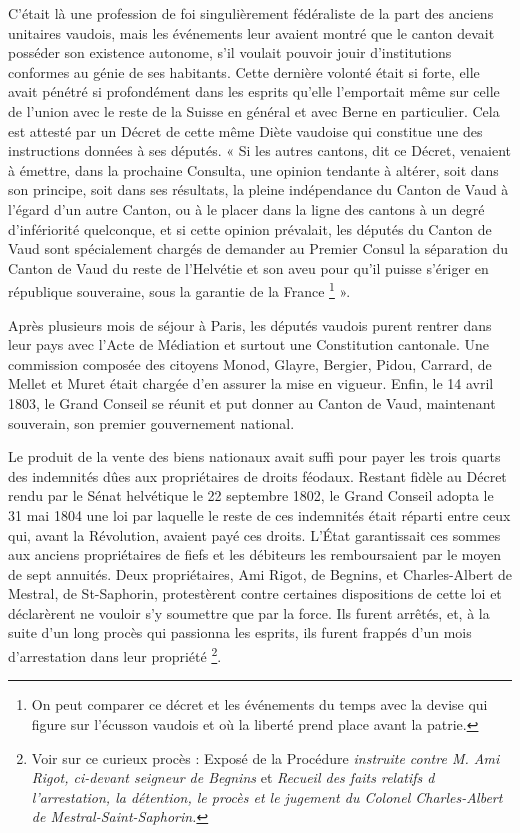 \documentclass[french,twoside]{book} %
\begin{document}
\noindent C’était là une profession de foi singulièrement fédéraliste de la part des anciens unitaires vaudois, mais les événements leur avaient montré que le canton devait posséder son existence autonome, s’il voulait pouvoir jouir d’institutions conformes au génie de ses habitants. Cette dernière volonté était si forte, elle avait pénétré si profondément dans les esprits qu’elle l’emportait même sur celle de l’union avec le reste de la Suisse en général et avec Berne en particulier. Cela est attesté par un Décret de cette même Diète vaudoise qui constitue une des instructions données à ses députés. « Si les autres cantons, dit ce Décret, venaient à émettre, dans la prochaine Consulta, une opinion tendante à altérer, soit dans son principe, soit dans ses résultats, la pleine indépendance du Canton de Vaud à l’égard d’un autre Canton, ou à le placer dans la ligne des cantons à un degré d’infériorité quelconque, et si cette opinion prévalait, les députés du Canton de Vaud sont spécialement chargés de demander au Premier Consul la séparation du Canton de Vaud du reste de l’Helvétie et son aveu pour qu’il puisse s’ériger en république souveraine, sous la garantie de la France \footnote{On peut comparer ce décret et les événements du temps avec la devise qui figure sur l’écusson vaudois et où la liberté prend place avant la patrie.} ».\par
Après plusieurs mois de séjour à Paris, les députés vaudois purent rentrer dans leur pays avec l’Acte de Médiation et surtout une Constitution cantonale. Une commission composée des citoyens Monod, Glayre, Bergier, Pidou, Carrard, de Mellet et Muret était chargée d’en assurer la mise en vigueur. Enfin, le 14 avril 1803, le Grand Conseil se réunit et put donner au Canton de Vaud, maintenant souverain, son premier gouvernement national.\par
Le produit de la vente des biens nationaux avait suffi pour payer les trois quarts des indemnités dûes aux propriétaires de droits féodaux. Restant fidèle au Décret rendu par le Sénat helvétique le 22 septembre 1802, le Grand Conseil adopta le 31 mai 1804 une loi par laquelle le reste de ces indemnités était réparti entre ceux qui, avant la Révolution, avaient payé ces droits. L’État garantissait ces sommes aux anciens propriétaires de fiefs et les débiteurs les remboursaient par le moyen de sept annuités. Deux propriétaires, Ami Rigot, de Begnins, et Charles-Albert de Mestral, de St-Saphorin, protestèrent contre certaines dispositions de cette loi et déclarèrent ne vouloir s’y soumettre que par la force. Ils furent arrêtés, et, à la suite d’un long procès qui passionna les esprits, ils furent frappés d’un mois d’arrestation dans leur propriété \footnote{Voir sur ce curieux procès : Exposé de la Procédure \emph{instruite contre M. Ami Rigot, ci-devant seigneur de Begnins} et \emph{Recueil des faits relatifs d l’arrestation, la détention, le procès et le jugement du Colonel Charles-Albert de Mestral-Saint-Saphorin.}}.\par
\end{document}
